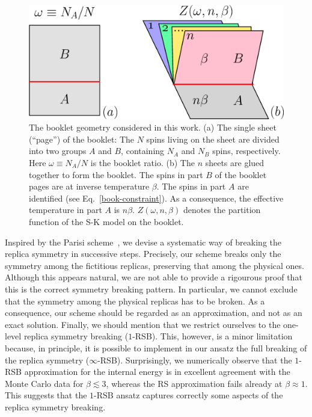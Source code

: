 \documentclass[twocolumn,superscriptaddress,prb,10pt]{revtex4-1}
\begin{document}
\begin{figure}[t]
\includegraphics*[width=0.93\linewidth]{./draft_figs/cartoon}
\caption{ The booklet geometry considered in this work. (a) The single sheet 
 (``page'') of the booklet: The $N$ spins living on the sheet are divided into 
 two groups $A$ and $B$, containing $N_A$ and $N_B$ spins, respectively. Here 
 $\omega\equiv N_A/N$ is the booklet ratio. (b) The $n$ sheets are glued together 
 to form the booklet. The spins in part $B$ of the booklet pages are at inverse 
 temperature $\beta$. The spins in part $A$ are identified  (see Eq.~\eqref{book-constraint}). 
 As a consequence, the effective temperature in part $A$ is $n\beta$. 
 $Z(\omega,n,\beta)$ denotes the partition function of the S-K model on 
 the booklet. 
}
\label{cartoon}
\end{figure}

Inspired by the Parisi scheme~\cite{parisi-1979}, we devise a systematic 
way of breaking the replica symmetry in successive steps. Precisely, our scheme  
breaks only the symmetry among the fictitious replicas, preserving that among the 
physical ones. Although this appears natural, we are not able to provide a rigourous 
proof that this is the correct symmetry breaking pattern. In particular, we cannot 
exclude that the symmetry among the physical replicas has to be broken. As a consequence, 
our scheme should be regarded as an approximation, and not as an exact solution. 
Finally, we should mention that we restrict ourselves to the one-level replica symmetry 
breaking ($1$-RSB). This, however, is a minor limitation because, in principle, it is 
possible to implement in our ansatz the full breaking of the replica symmetry 
($\infty$-RSB). Surprisingly, we numerically observe that the $1$-RSB approximation 
for the internal energy is in excellent agreement with the Monte Carlo data for  
$\beta\lesssim 3$, whereas the RS approximation fails already at $\beta\approx 1$. 
This suggests that the $1$-RSB ansatz captures correctly some aspects of the 
replica symmetry breaking. 
\end{document}
